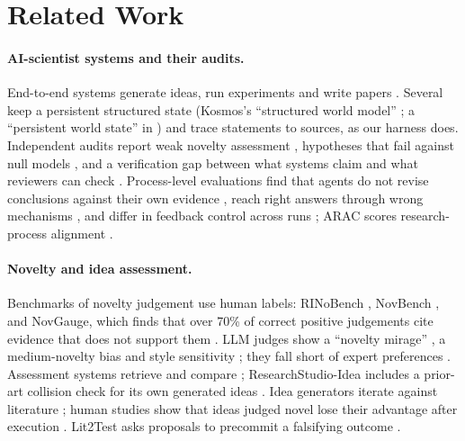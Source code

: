 \section{Related Work}\label{sec:related}

\paragraph{AI-scientist systems and their audits.} End-to-end systems generate ideas, run experiments and write papers \citep{lu2024the,yamada2025the,schmidgall2025agent,schmidgall2025agentrxiv,gottweis2025accelerating,mitchener2025kosmos,miyai2025jr,li2026autosota,wang2026sibylautoresearch,zheng2026rethinking}. Several keep a persistent structured state (Kosmos's ``structured world model'' \citep{mitchener2025kosmos}; a ``persistent world state'' in \citep{weidener2026rethinking}) and trace statements to sources, as our harness does. Independent audits report weak novelty assessment \citep{beel2025evaluating}, hypotheses that fail against null models \citep{nusrat2025when}, and a verification gap between what systems claim and what reviewers can check \citep{ding2026autonomous}. Process-level evaluations find that agents do not revise conclusions against their own evidence \citep{fei2026how}, reach right answers through wrong mechanisms \citep{eulig2026position}, and differ in feedback control across runs \citep{li2026beyond}; ARAC scores research-process alignment \citep{cui2026arac}.

\paragraph{Novelty and idea assessment.} Benchmarks of novelty judgement use human labels: RINoBench \citep{schopf2026is}, NovBench \citep{wu2026novbench}, and NovGauge, which finds that over 70\% of correct positive judgements cite evidence that does not support them \citep{zhang2026novgauge}. LLM judges show a ``novelty mirage'' \citep{sinhahajari2026on}, a medium-novelty bias \citep{schopf2026thinkproberespond} and style sensitivity \citep{ji2026style}; they fall short of expert preferences \citep{chen2026ideation}. Assessment systems retrieve and compare \citep{shahid2025literaturegrounded,moussa2025scholareval,qiao2026innoeval,zhang2026opennovelty,hou2026memonoveltyagent,shen2026navigating,han2026noveltyaware,yan2025noveltyrank}; ResearchStudio-Idea includes a prior-art collision check for its own generated ideas \citep{zhao2026researchstudioidea}. Idea generators iterate against literature \citep{wang2023scimon,baek2024researchagent,radensky2024humanllm,li2024chain,ke2025biodisco}; human studies show that ideas judged novel lose their advantage after execution \citep{si2024can,si2025the}. Lit2Test asks proposals to precommit a falsifying outcome \citep{wang2026what}.

